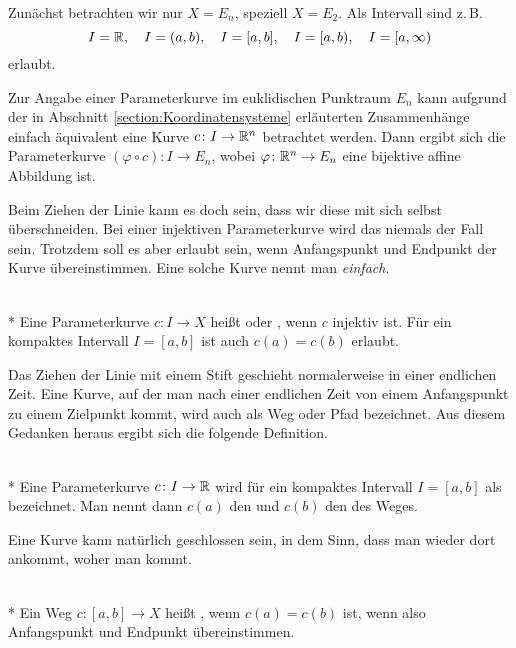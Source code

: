 \noindent
Zunächst betrachten wir nur $X=E_n$, speziell $X=E_2$. Als Intervall
sind z.\,B.%
\[I=\mathbb R,\quad I=(a,b),\quad I=[a,b],\quad
I=[a,b),\quad I=[a,\infty)\]
erlaubt.

Zur Angabe einer Parameterkurve im euklidischen Punktraum $E_n$ kann
aufgrund der in Abschnitt \ref{section:Koordinatensysteme} erläuterten
Zusammenhänge einfach äquivalent eine Kurve $c\colon I \to\mathbb R^n$
betrachtet werden. Dann ergibt sich die Parameterkurve
$(\varphi\circ c)\colon I\to E_n$,
wobei $\varphi\colon \mathbb R^n\to E_n$ eine bijektive affine Abbildung ist.

Beim Ziehen der Linie kann es doch sein, dass wir diese mit sich selbst
überschneiden. Bei einer injektiven Parameterkurve wird das niemals
der Fall sein. Trotzdem soll es aber erlaubt sein, wenn Anfangspunkt
und Endpunkt der Kurve übereinstimmen. Eine solche Kurve nennt man
\emph{einfach}.

\begin{definition}\mbox{}\\*
Eine Parameterkurve $c\colon I\to X$ heißt  oder
, wenn $c$ injektiv ist. Für ein kompaktes
Intervall $I=[a,b]$ ist auch $c(a)=c(b)$ erlaubt.
\end{definition}

\noindent
Das Ziehen der Linie mit einem Stift geschieht normalerweise in einer
endlichen Zeit. Eine Kurve, auf der man nach einer endlichen Zeit
von einem Anfangspunkt zu einem Zielpunkt kommt, wird auch als
Weg oder Pfad bezeichnet. Aus diesem Gedanken heraus
ergibt sich die folgende Definition.

\begin{definition}\mbox{}\\*
Eine Parameterkurve $c\colon I\to\mathbb R$ wird für ein kompaktes
Intervall $I=[a,b]$ als  bezeichnet. Man nennt dann
$c(a)$ den  und $c(b)$ den
 des Weges.
\end{definition}

\noindent
Eine Kurve kann natürlich geschlossen sein, in dem Sinn, dass man
wieder dort ankommt, woher man kommt.

\begin{definition}%
\mbox{}\\*
Ein Weg $c\colon [a,b]\to X$ heißt ,
wenn $c(a)=c(b)$ ist, wenn also Anfangspunkt und
Endpunkt übereinstimmen.
\end{definition}

